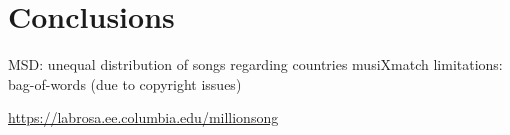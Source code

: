 \documentclass[11pt]{article}
\renewcommand\_{\textunderscore\allowbreak}
\begin{document}
	
\section{Conclusions}

MSD: unequal distribution of songs regarding countries
musiXmatch limitations: bag-of-words (due to copyright issues)





\begin{thebibliography}{}

\url{https://labrosa.ee.columbia.edu/millionsong}

\end{thebibliography}
\end{document}
